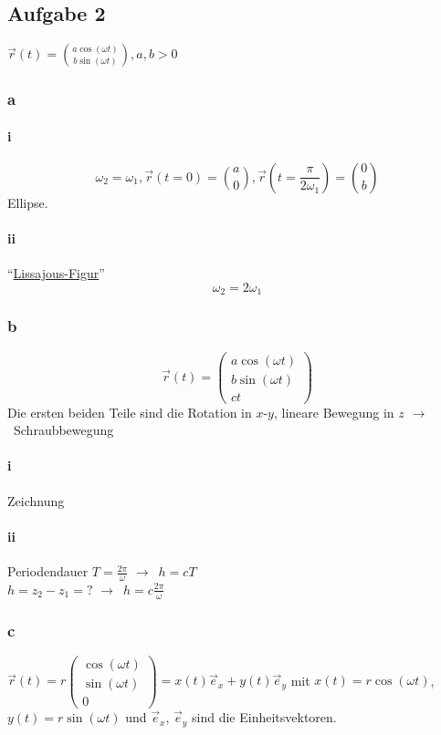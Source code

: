 \documentclass[oneside]{book}
\theoremstyle{definition}
\newcommand{\conseq}{$\rightarrow$~}
\begin{document}
\subsection{Aufgabe 2}
$\vec{r}(t) = \binom{a \cos(\omega t)}{b\sin(\omega t)}, a, b > 0$

\subsubsection{a}
\paragraph{i}
$$\omega_2 = \omega_1, \vec{r}(t = 0) = \binom{a}{0}, \vec{r}(t = \frac{\pi}{2 \omega_1}) = \binom{0}{b}$$
Ellipse.

\paragraph{ii}
"`\href{http://de.wikipedia.org/wiki/Lissajous-Figur}{Lissajous-Figur}"'
$$\omega_2 = 2 \omega_1$$

\subsubsection{b}
$$\vec{r}(t) = \begin{pmatrix}
a \cos(\omega t)\\ b \sin(\omega t) \\ c t
\end{pmatrix}$$
Die ersten beiden Teile sind die Rotation in $x$-$y$, lineare Bewegung in $z$ \conseq Schraubbewegung

\paragraph{i}
Zeichnung

\paragraph{ii}

Periodendauer $T = \frac{2 \pi}{\omega}$ \conseq $h = c T$\\
$h = z_2 - z_1 = ?$ \conseq $h = c \frac{2 \pi}{\omega}$

\subsubsection{c}
$\vec{r}(t) = r\begin{pmatrix}\cos(\omega t) \\ \sin(\omega t) \\ 0\end{pmatrix} = x(t) \vec{e}_x + y(t)\vec{e}_y$ mit $x(t) = r \cos(\omega t)$, $y(t) = r \sin(\omega t)$ und $\vec{e}_x$, $\vec{e}_y$ sind die Einheitsvektoren.
\end{document}
